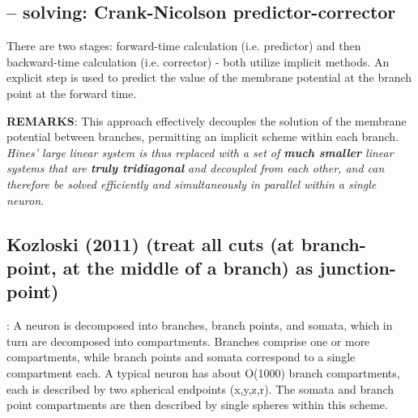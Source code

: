 \subsection{-- solving: Crank-Nicolson predictor-corrector}

There are two stages: forward-time calculation (i.e. predictor) and then
backward-time calculation (i.e. corrector) - both utilize implicit methods.
An explicit step is used to predict the value of the membrane potential at the
branch point at the forward time.

% 
% 
% 



{\bf REMARKS}:
This approach effectively decouples the solution of the membrane potential
between branches, permitting an implicit scheme within each branch.
{\it Hines' large linear system is thus replaced with a set of {\bf much
smaller} linear systems that are {\bf truly tridiagonal} and decoupled from each
other, and can therefore be solved efficiently and simultaneously in parallel
within a single neuron.}




\subsection{Kozloski (2011) (treat all cuts (at branch-point, at the middle of a
branch) as junction-point)}
\label{sec:kozloski2011-NTS}

\citep{kozloski2011}: A neuron is decomposed into branches, branch points, and
somata, which in turn are decomposed into compartments. Branches comprise one or
more compartments, while branch points and somata correspond to a single
compartment each.
A typical neuron has about O(1000) branch compartments, each is described by two
spherical endpoints (x,y,z,r).
The somata and branch point compartments are then described by single spheres
within this scheme.

